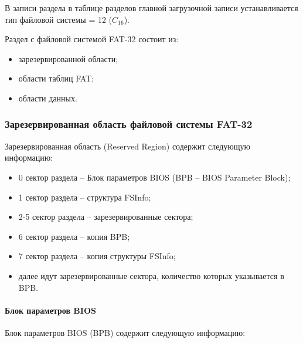В записи раздела в таблице разделов главной загрузочной записи устанавливается тип файловой системы = 12 ($C_{16}$).

Раздел с файловой системой FAT-32 состоит из:

\begin{itemize}
\item зарезервированной области;
\item области таблиц FAT;
\item области данных.
\end{itemize}

\subsubsection{Зарезервированная область файловой системы FAT-32}

Зарезервированная область (Reserved Region) содержит следующую информацию:

\begin{itemize}
\item 0 сектор раздела -- Блок параметров BIOS (BPB -- BIOS Parameter Block);
\item 1 сектор раздела -- структура FSInfo;
\item 2-5 сектор раздела -- зарезервированные сектора;
\item 6 сектор раздела -- копия BPB;
\item 7 сектор раздела -- копия структуры FSInfo;
\item далее идут зарезервированные сектора, количество которых указывается в BPB.
\end{itemize}

\paragraph{Блок параметров BIOS}

Блок параметров BIOS (BPB) содержит следующую информацию:

